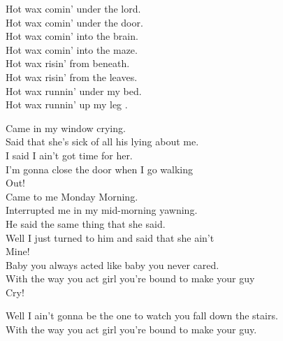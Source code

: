 Hot wax comin' under the lord. \\
Hot wax comin' under the door. \\
Hot wax comin' into the brain. \\
Hot wax comin' into the maze. \\

Hot wax risin' from beneath. \\
Hot wax risin' from the leaves. \\
Hot wax runnin' under my bed. \\
Hot wax runnin' up my leg . \\




Came in my window crying. \\
Said that she's sick of all his lying about me. \\
I said I ain't got time for her. \\
I'm gonna close the door when I go walking \\
Out! \\

Came to me Monday Morning. \\
Interrupted me in my mid-morning yawning. \\
He said the same thing that she said. \\
Well I just turned to him and said that she ain't \\
Mine! \\

Baby you always acted like baby you never cared. \\
With the way you act girl you're bound to make your guy \\
Cry!

Well I ain't gonna be the one to watch you fall down the stairs. \\
With the way you act girl you're bound to make your guy. \\







